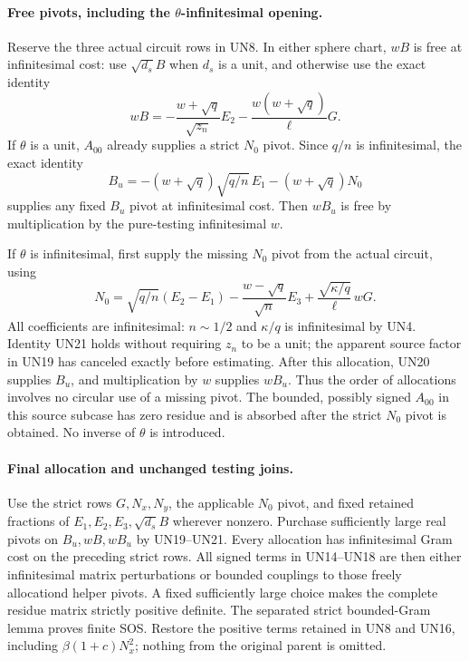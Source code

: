 \paragraph{Free pivots, including the $\theta$-infinitesimal opening.}
Reserve the three actual circuit rows in UN8. In either sphere
chart, $wB$ is free at infinitesimal cost: use $\sqrt{d_s}B$ when
$d_s$ is a unit, and otherwise use the exact identity
\[
 wB=-\frac{w+\sqrt q}{\sqrt{z_n}}E_2
                 -\frac{w(w+\sqrt q)}\ell G.
 \tag{UN19}
\]
If $\theta$ is a unit, $A_{00}$ already supplies a strict $N_0$
pivot. Since $q/n$ is infinitesimal, the exact identity
\[
 B_u=-(w+\sqrt q)\sqrt{q/n}\,E_1-(w+\sqrt q)N_0
 \tag{UN20}
\]
supplies any fixed $B_u$ pivot at infinitesimal cost. Then $wB_u$ is
free by multiplication by the pure-testing infinitesimal $w$.

If $\theta$ is infinitesimal, first supply the missing $N_0$ pivot
from the actual circuit, using
\[
 N_0=\sqrt{q/n}(E_2-E_1)
       -\frac{w-\sqrt q}{\sqrt n}E_3
       +\frac{\sqrt{\kappa/q}}\ell\,wG.
 \tag{UN21}
\]
All coefficients are infinitesimal: $n\sim1/2$ and $\kappa/q$
is infinitesimal by UN4. Identity UN21 holds without requiring
$z_n$ to be a unit; the apparent source factor in UN19 has
canceled exactly before estimating. After this allocation, UN20
supplies $B_u$, and multiplication by $w$ supplies $wB_u$. Thus the
order of allocations involves no circular use of a missing pivot.
The bounded, possibly signed $A_{00}$ in this source subcase
has zero residue and is absorbed after the strict $N_0$ pivot is
obtained. No inverse of $\theta$ is introduced.

\paragraph{Final allocation and unchanged testing joins.}
Use the strict rows $G,N_x,N_y$, the applicable $N_0$ pivot, and
fixed retained fractions of $E_1,E_2,E_3,\sqrt{d_s}B$ wherever
nonzero. Purchase sufficiently large real pivots on $B_u,wB,wB_u$
by UN19--UN21. Every allocation has infinitesimal Gram cost on
the preceding strict rows. All signed terms in UN14--UN18 are
then either infinitesimal matrix perturbations or bounded
couplings to those freely allocationd helper pivots. A fixed
sufficiently large choice makes the complete residue matrix
strictly positive definite. The separated strict bounded-Gram
lemma proves finite SOS. Restore the positive terms retained
in UN8 and UN16, including $\beta(1+c)N_x^2$; nothing from the
original parent is omitted.

